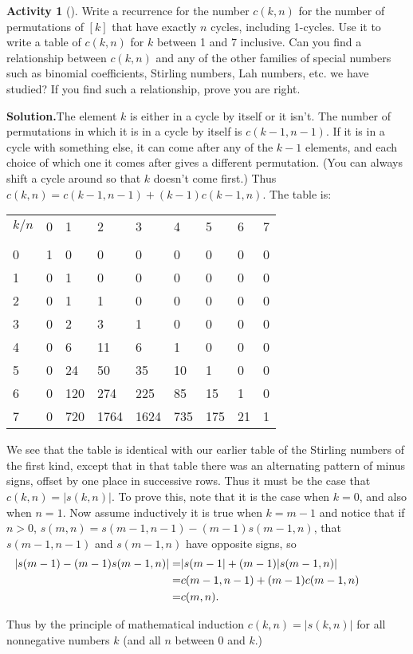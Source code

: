 \documentclass[10pt,]{book}
\theoremstyle{plain}
\theoremstyle{definition}
\newtheorem{activity}[project]{Activity}
\numberwithin{equation}{chapter}
\newcommand{\hrulethin}  {\noalign{\hrule height 0.04em}}
\newcommand{\amp}{&}
\begin{document}
\begin{activity}[]\label{activity-271}
Write a recurrence for the number \(c(k,n)\) for the number of permutations of \([k]\) that have exactly \(n\) cycles, including 1-cycles. Use it to write a table of \(c(k,n)\) for \(k\) between 1 and 7 inclusive. Can you find a relationship between \(c(k,n)\) and any of the other families of special numbers such as binomial coefficients, Stirling numbers, Lah numbers, etc. we have studied? If you find such a relationship, prove you are right.%
\par\medskip\noindent%
\textbf{Solution.}\quad The element \(k\) is either in a cycle by itself or it isn't. The number of permutations in which it is in a cycle by itself is \(c(k-1,n-1)\). If it is in a cycle with something else, it can come after any of the \(k-1\) elements, and each choice of which one it comes after gives a different permutation. (You can always shift a cycle around so that \(k\) doesn't come first.) Thus \(c(k,n) = c(k-1,n-1) + (k-1)c(k-1,n)\). The table is:%
\begin{tabular}{lllllllll}
\(k/n\)&0&1&2&3&4&5&6&7\tabularnewline[0pt]
&&&&&&&&\tabularnewline\hrulethin
0&1&0&0&0&0&0&0&0\tabularnewline[0pt]
1&0&1&0&0&0&0&0&0\tabularnewline[0pt]
2&0&1&1&0&0&0&0&0\tabularnewline[0pt]
3&0&2&3&1&0&0&0&0\tabularnewline[0pt]
4&0&6&11&6&1&0&0&0\tabularnewline[0pt]
5&0&24&50&35&10&1&0&0\tabularnewline[0pt]
6&0&120&274&225&85&15&1&0\tabularnewline[0pt]
7&0&720&1764&1624&735&175&21&1
\end{tabular}
We see that the table is identical with our earlier table of the Stirling numbers of the first kind, except that in that table there was an alternating pattern of minus signs, offset by one place in successive rows. Thus it must be the case that \(c(k,n)=
|s(k,n)|\). To prove this, note that it is the case when \(k=0\), and also when \(n=1\). Now assume inductively it is true when \(k= m-1\) and notice that if \(n>0\), \(s(m,n)=s(m-1,n-1)-(m-1)s(m-1,n)\), that \(s(m-1,n-1)\) and \(s(m-1,n)\) have opposite signs, so%
\begin{align*}
\hspace{-.5in}|s(m-1)-(m-1)s(m-1,n)| =\amp  |s(m-1| +
(m-1)|s(m-1,n)|\\
=\amp c(m-1,n-1)+(m-1)c(m-1,n)\\
=\amp  c(m,n).
\end{align*}
%
\par
Thus by the principle of mathematical induction \(c(k,n) = |s(k,n)|\) for all nonnegative numbers \(k\) (and all \(n\) between 0 and \(k\).)%
\end{activity}
\end{document}
